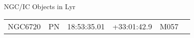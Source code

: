 \begin{block}{NGC/IC Objects in Lyr}
  \centering
  \begin{tabularx}{\textwidth}{llrrll} \toprule 
    NGC6720 & PN & 18:53:35.01 & +33:01:42.9  & M057 \\ 
  \end{tabularx}
\end{block}